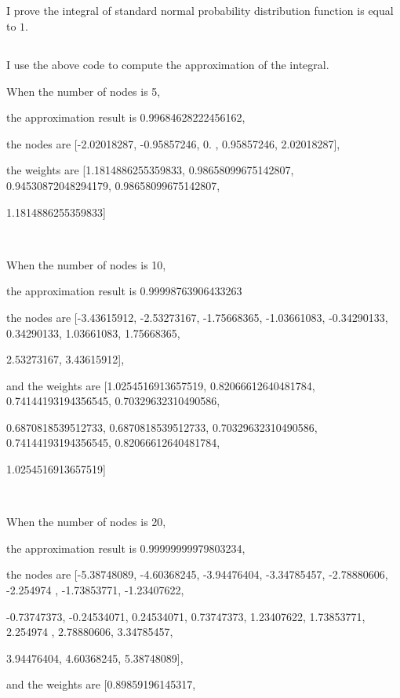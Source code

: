 \documentclass{article}
\begin{document}
	\subsection{}
	 	I prove the integral of standard normal probability distribution function is equal to $1$.
	\subsection{}
		I use the above code to compute the approximation of the integral.\par
		When the number of nodes is 5, \par the approximation result is 0.99684628222456162, \par the nodes are [-2.02018287, -0.95857246,  0.        ,  0.95857246,  2.02018287], \par the weights are [1.1814886255359833,
 0.98658099675142807,
 0.94530872048294179,
 0.98658099675142807,\par
 1.1814886255359833]
 		\par
		\ 
		\par
		When the number of nodes is 10, \par
		the approximation result is 0.99998763906433263 \par
		the nodes are [-3.43615912, -2.53273167, -1.75668365, -1.03661083, -0.34290133,
         0.34290133,  1.03661083,  1.75668365, \par 2.53273167,  3.43615912], \par
         	and the weights are [1.0254516913657519,
 0.82066612640481784,
 0.74144193194356545,
 0.70329632310490586,\par
 0.6870818539512733,
 0.6870818539512733,
 0.70329632310490586,
 0.74144193194356545,
 0.82066612640481784,\par
 1.0254516913657519] \par
 		\ 
		\par
 		When the number of nodes is 20, \par
		the approximation result is 0.99999999979803234, \par
		the nodes are [-5.38748089, -4.60368245, -3.94476404, -3.34785457, -2.78880606,
        -2.254974  , -1.73853771, -1.23407622, \par -0.73747373, -0.24534071,
         0.24534071,  0.73747373,  1.23407622,  1.73853771,  2.254974  ,
         2.78880606,  3.34785457,  \par 3.94476404,  4.60368245,  5.38748089], \par
         	and the weights are [0.89859196145317,
\end{document}
